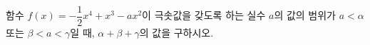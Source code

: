 함수 $f(x)=-\dfrac{1}{2}x^4+x^3-ax^2$이 극솟값을 갖도록 하는 실수 $a$의 값의 범위가 $a<\alpha$ 또는 $\beta<a<\gamma$일 때, $\alpha+\beta+\gamma$의 값을 구하시오.

